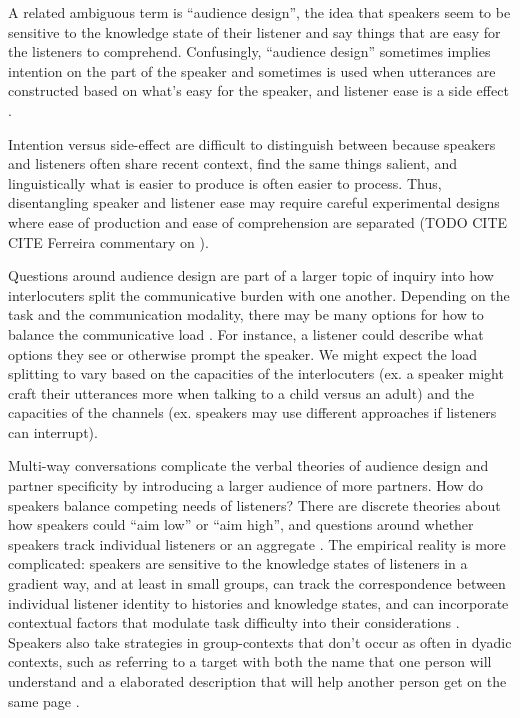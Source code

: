 \documentclass[]{article}
\begin{document}
A related ambiguous term is ``audience design'', the idea that speakers seem to be sensitive to the knowledge state of their listener and say things that are easy for the listeners to comprehend. Confusingly, ``audience design'' sometimes implies intention on the part of the speaker and sometimes is used when utterances are constructed based on what's easy for the speaker, and listener ease is a side effect \cite{horton1996, rogers2013, macdonald2013, horton2002a, horton2005}.

  Intention versus side-effect are difficult to distinguish between because speakers and listeners often share recent context, find the same things salient, and linguistically what is easier to produce is often easier to process. Thus, disentangling speaker and listener ease may require careful experimental designs where ease of production and ease of comprehension are separated (TODO CITE CITE Ferreira commentary on \cite{pickering2004}). 
  
Questions around audience design are part of a larger topic of inquiry into how interlocuters split the communicative burden with one another.  
Depending on the task and the communication modality, there may be many options for how to balance the communicative load  \cite{clark1996, fay2010, foxtree2013}. For instance, a listener could describe what options they see or otherwise prompt the speaker. We might expect the load splitting to vary based on the capacities of the interlocuters (ex. a speaker might craft their utterances more when talking to a child versus an adult) and the capacities of the channels (ex. speakers may use different approaches if listeners can interrupt). 

Multi-way conversations complicate the verbal theories of audience design and partner specificity by introducing a larger audience of more partners. How do speakers balance competing needs of listeners? There are discrete theories about how speakers could ``aim low'' or ``aim high'', and questions around whether speakers track individual listeners or an aggregate \cite{yoon2014}. The empirical reality is more complicated: speakers are sensitive to the knowledge states of listeners in a gradient way, and at least in small groups, can track the correspondence between individual listener identity to histories and knowledge states, and can incorporate contextual factors that modulate task difficulty into their considerations \cite{yoon2014. yoon2018, yoon2019, yoon2019a}. Speakers also take strategies in group-contexts that don't occur as often in dyadic contexts, such as referring to a target with both the name that one person will understand and a elaborated description that will help another person get on the same page \cite{yoon2018}. 
\end{document}
